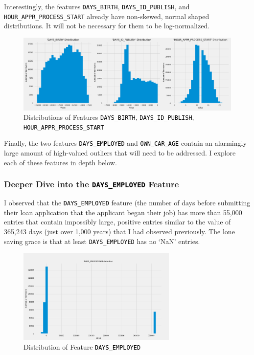 \documentclass[12pt, letterpaper]{article}
\begin{document}
Interestingly, the features \colorbox{backcolor}{\textcolor{black}{\texttt{DAYS_BIRTH}}}, \colorbox{backcolor}{\textcolor{black}{\texttt{DAYS_ID_PUBLISH}}}, and \colorbox{backcolor}{\textcolor{black}{\texttt{HOUR_APPR_PROCESS_START}}} already have non-skewed, normal shaped distributions. It will not be necessary for them to be log-normalized.

\begin{figure}[ht]
\includegraphics[width=\textwidth]{distribsDAYSBIRTHDAYSIDPUBLISHHOURAPPRPROCESSSTART}
\centering
\caption{Distributions of Features \colorbox{backcolor}{\textcolor{black}{\texttt{DAYS_BIRTH}}}, \colorbox{backcolor}{\textcolor{black}{\texttt{DAYS_ID_PUBLISH}}}, \colorbox{backcolor}{\textcolor{black}{\texttt{HOUR_APPR_PROCESS_START}}}}
\end{figure}

Finally, the two features \colorbox{backcolor}{\textcolor{black}{\texttt{DAYS_EMPLOYED}}} and \colorbox{backcolor}{\textcolor{black}{\texttt{OWN_CAR_AGE}}} contain an alarmingly large amount of high-valued outliers that will need to be addressed. I explore each of these features in depth below.

\subsubsection{Deeper Dive into the \colorbox{backcolor}{\textcolor{black}{\texttt{DAYS_EMPLOYED}}} Feature}
I observed that the \colorbox{backcolor}{\textcolor{black}{\texttt{DAYS_EMPLOYED}}} feature (the number of days before submitting their loan application that the applicant began their job) has more than 55,000 entries that contain impossibly large, positive entries similar to the value of 365,243 days (just over 1,000 years) that I had observed previously. The lone saving grace is that at least \colorbox{backcolor}{\textcolor{black}{\texttt{DAYS_EMPLOYED}}} has no `NaN' entries.

\begin{figure}[ht]
\includegraphics[width=0.7\textwidth]{distribDAYSEMPLOYED}
\centering
\caption{Distribution of Feature \colorbox{backcolor}{\textcolor{black}{\texttt{DAYS_EMPLOYED}}}}
\end{figure}
\end{document}
